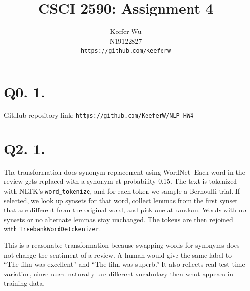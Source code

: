 \documentclass{article}
\title{CSCI 2590: Assignment 4}
\author{Keefer Wu \\ N19122827 \\ \texttt{https://github.com/KeeferW}}
\date{}
\begin{document}
\maketitle

\section*{Q0. 1.}
GitHub repository link: \texttt{https://github.com/KeeferW/NLP-HW4}

\section*{Q2. 1.}

The transformation does synonym replacement using WordNet. Each word in the review gets replaced with a synonym at probability 0.15. The text is tokenized with NLTK's \texttt{word\_tokenize}, and for each token we sample a Bernoulli trial. If selected, we look up synsets for that word, collect lemmas from the first synset that are different from the original word, and pick one at random. Words with no synsets or no alternate lemmas stay unchanged. The tokens are then rejoined with \texttt{TreebankWordDetokenizer}.

This is a reasonable transformation because swapping words for synonyms does not change the sentiment of a review. A human would give the same label to ``The film was excellent'' and ``The film was superb.'' It also reflects real test time variation, since users naturally use different vocabulary then what appears in training data.
\end{document}
